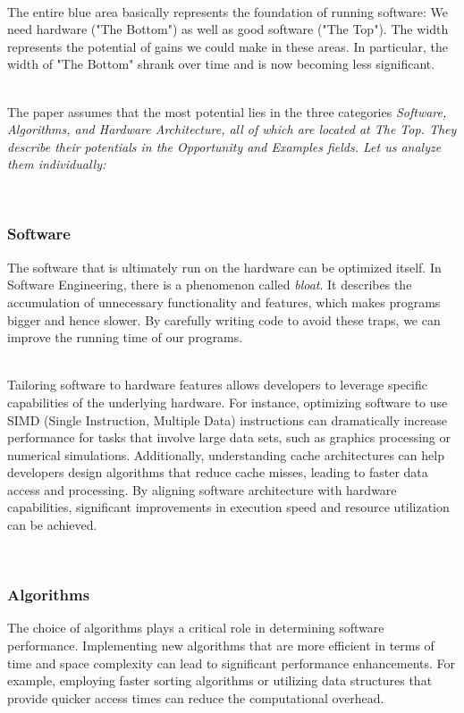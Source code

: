 \documentclass[../../main.tex]{subfiles}
\begin{document}
    ~\\
    The entire blue area basically represents the foundation of running software:
    We need hardware ("The Bottom") as well as good software ("The Top").
    The width represents the potential of gains we could make in these areas.
    In particular, the width of "The Bottom" shrank over time and is now becoming less significant.

    ~\\
    The paper assumes that the most potential lies in the three categories \em Software, Algorithms, and Hardware Architecture\em, all of which are located at The Top.
    They describe their potentials in the \em Opportunity \em and \em Examples \em fields. Let us analyze them individually:

    ~\\
    \subsubsection{Software}
    The software that is ultimately run on the hardware can be optimized itself.
    In Software Engineering, there is a phenomenon called \emph{bloat}.
    It describes the accumulation of unnecessary functionality and features, which makes programs bigger and hence slower.
    By carefully writing code to avoid these traps, we can improve the running time of our programs.

    ~\\
    Tailoring software to hardware features allows developers to leverage specific capabilities of the underlying hardware. For instance, optimizing software to use SIMD (Single Instruction, Multiple Data) instructions can dramatically increase performance for tasks that involve large data sets, such as graphics processing or numerical simulations. Additionally, understanding cache architectures can help developers design algorithms that reduce cache misses, leading to faster data access and processing. By aligning software architecture with hardware capabilities, significant improvements in execution speed and resource utilization can be achieved.

    ~\\
    \subsubsection{Algorithms}
    The choice of algorithms plays a critical role in determining software performance. Implementing new algorithms that are more efficient in terms of time and space complexity can lead to significant performance enhancements. For example, employing faster sorting algorithms or utilizing data structures that provide quicker access times can reduce the computational overhead. 
\end{document}
